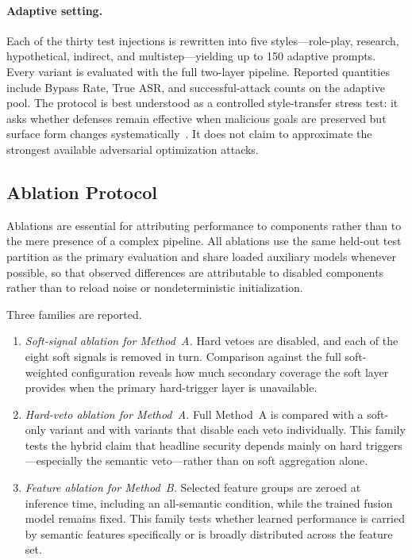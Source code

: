 ﻿\documentclass[10pt]{article}
\begin{document}
\paragraph{Adaptive setting.}
Each of the thirty test injections is rewritten into five styles---role-play, research, hypothetical, indirect, and multistep---yielding up to 150 adaptive prompts.
Every variant is evaluated with the full two-layer pipeline.
Reported quantities include Bypass Rate, True ASR, and successful-attack counts on the adaptive pool.
The protocol is best understood as a controlled style-transfer stress test: it asks whether defenses remain effective when malicious goals are preserved but surface form changes systematically~\cite{promptfoo2024owasp,zizzo2025adversarial}.
It does not claim to approximate the strongest available adversarial optimization attacks.

\subsection{Ablation Protocol}
\label{sec:ablation-setup}

Ablations are essential for attributing performance to components rather than to the mere presence of a complex pipeline.
All ablations use the same held-out test partition as the primary evaluation and share loaded auxiliary models whenever possible, so that observed differences are attributable to disabled components rather than to reload noise or nondeterministic initialization.

Three families are reported.

\begin{enumerate}
  \item \emph{Soft-signal ablation for Method~A.}
    Hard vetoes are disabled, and each of the eight soft signals is removed in turn.
    Comparison against the full soft-weighted configuration reveals how much secondary coverage the soft layer provides when the primary hard-trigger layer is unavailable.
  \item \emph{Hard-veto ablation for Method~A.}
    Full Method~A is compared with a soft-only variant and with variants that disable each veto individually.
    This family tests the hybrid claim that headline security depends mainly on hard triggers---especially the semantic veto---rather than on soft aggregation alone.
  \item \emph{Feature ablation for Method~B.}
    Selected feature groups are zeroed at inference time, including an all-semantic condition, while the trained fusion model remains fixed.
    This family tests whether learned performance is carried by semantic features specifically or is broadly distributed across the feature set.
\end{enumerate}
\end{document}
